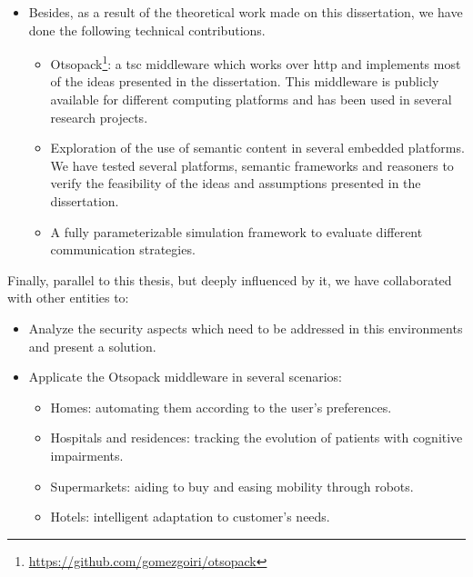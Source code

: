 \begin{itemize}
  \item Besides, as a result of the theoretical work made on this dissertation, we have done the following technical contributions.
    \begin{itemize}
      \item Otsopack\footnote{\url{https://github.com/gomezgoiri/otsopack}}: a \ac{tsc} middleware which works over \ac{http} and implements most of the ideas presented in the dissertation.
            This middleware is publicly available for different computing platforms and has been used in several research projects.
      \item Exploration of the use of semantic content in several embedded platforms.
	    We have tested several platforms, semantic frameworks and reasoners to verify the feasibility of the ideas and assumptions presented in the dissertation.
      \item A fully parameterizable simulation framework to evaluate different communication strategies. %
    \end{itemize}
\end{itemize}


Finally, parallel to this thesis, but deeply influenced by it, we have collaborated with other entities to:
\begin{itemize}
  \item Analyze the security aspects which need to be addressed in this environments and present a solution. %
  \item Applicate the Otsopack middleware in several scenarios:
    \begin{itemize}
      \item Homes: automating them according to the user's preferences. %
      \item Hospitals and residences: tracking the evolution of patients with cognitive impairments.  %
      \item Supermarkets: aiding to buy and easing mobility through robots.
      \item Hotels: intelligent adaptation to customer's needs.
    \end{itemize}
\end{itemize}